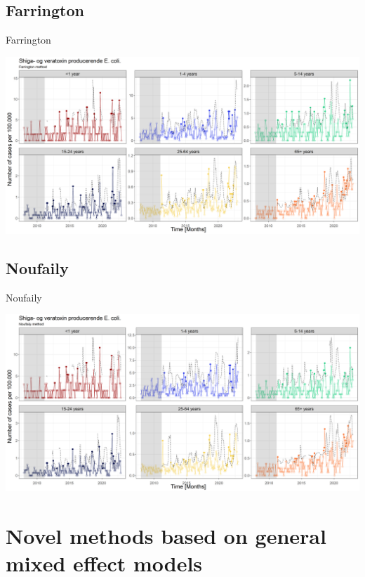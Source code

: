 \documentclass[aspectratio=169]{beamer}
\begin{document}
\hypertarget{farrington}{%
\subsection{Farrington}\label{farrington}}

\begin{frame}{Farrington}
\tiny

\includegraphics[width=1\linewidth]{../figures/STEC_farrington}

\normalsize
\end{frame}

\hypertarget{noufaily}{%
\subsection{Noufaily}\label{noufaily}}

\begin{frame}{Noufaily}
\tiny

\includegraphics[width=1\linewidth]{../figures/STEC_noufaily}

\normalsize
\end{frame}

\hypertarget{novel-methods-based-on-general-mixed-effect-models}{%
\section{Novel methods based on general mixed effect
models}\label{novel-methods-based-on-general-mixed-effect-models}}
\end{document}
